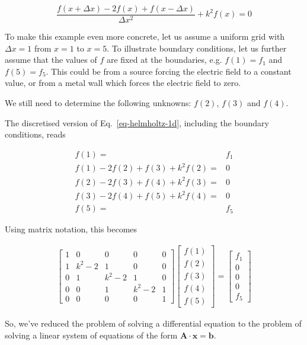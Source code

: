 \begin{equation}
\frac{f(x + \Delta x) -2 f(x) + f(x- \Delta x)}{ \Delta x^2} + k^2 f(x) = 0 \label{eq-hh-diff}
\end{equation}  
 
To make this example even more concrete, let us assume a uniform grid with $\Delta x=1$ from $x=1$ to $x=5$. To illustrate boundary conditions, let us further assume that the values of $f$ are fixed at the boundaries, e.g. $f(1)=f_1$ and $f(5)=f_5$. This could be from a source forcing the electric field to a constant value, or from a metal wall which forces the electric field to zero. 

We still need to determine the following unknowns: $f(2)$, $f(3)$ and $f(4)$.

The discretised version of Eq.~\ref{eq-helmholtz-1d}, including the boundary conditions, reads

\begin{align}
f(1)=&f_1 \\
f(1) -2f(2) + f(3) + k^2 f(2) =& 0 \\
f(2) -2f(3) + f(4) + k^2 f(3) =& 0\\
f(3) -2f(4) + f(5) + k^2 f(4) =& 0\\
f(5)=&f_5
\end{align} 

Using matrix notation, this becomes

\begin{gather}
\begin{bmatrix}
1& 0& 0& 0& 0 \\
1& k^2-2& 1& 0& 0 \\
0& 1& k^2-2& 1& 0  \\
0& 0& 1& k^2-2& 1  \\
0& 0& 0& 0& 1
\end{bmatrix}
\begin{bmatrix}
f(1) \\
f(2) \\
f(3) \\
f(4) \\
f(5)
\end{bmatrix}
= 
\begin{bmatrix}
f_1 \\
0 \\
0 \\
0 \\
f_5
\end{bmatrix} \label{eq-ex-fd}
\end{gather}

So, we've reduced the problem of solving a differential equation to the problem of solving a linear system of equations of the form ${\mathbf A}\cdot{\mathbf x}={\mathbf b}$.

